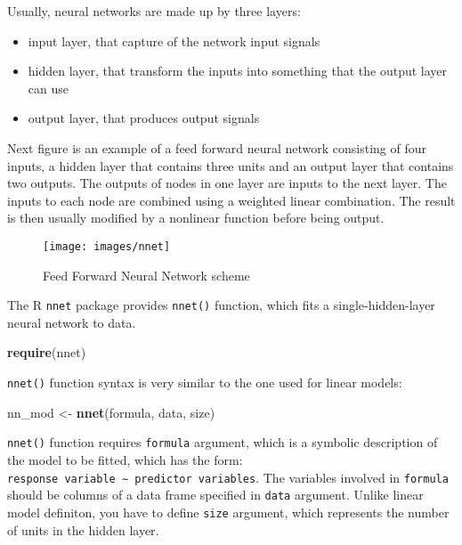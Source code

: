 \documentclass[]{book}
\newenvironment{Shaded}{\begin{snugshade}}{\end{snugshade}}
\newcommand{\KeywordTok}[1]{\textcolor[rgb]{0.13,0.29,0.53}{\textbf{{#1}}}}
\newcommand{\StringTok}[1]{\textcolor[rgb]{0.31,0.60,0.02}{{#1}}}
\newcommand{\NormalTok}[1]{{#1}}
\providecommand{\tightlist}{%
  \setlength{\itemsep}{0pt}\setlength{\parskip}{0pt}}
\def\tightlist{}
\begin{document}
Usually, neural networks are made up by three layers:

\begin{itemize}
\tightlist
\item
  input layer, that capture of the network input signals
\item
  hidden layer, that transform the inputs into something that the output
  layer can use
\item
  output layer, that produces output signals
\end{itemize}

Next figure is an example of a feed forward neural network consisting of
four inputs, a hidden layer that contains three units and an output
layer that contains two outputs. The outputs of nodes in one layer are
inputs to the next layer. The inputs to each node are combined using a
weighted linear combination. The result is then usually modified by a
nonlinear function before being output.

\begin{figure}[h]

{\centering \texttt{[image: images/nnet]} 

}

\caption{Feed Forward Neural Network scheme}\label{fig:g2}
\end{figure}

The R \texttt{nnet} package provides \texttt{nnet()} function, which
fits a single-hidden-layer neural network to data.

\begin{Shaded}
\begin{Highlighting}[]
\KeywordTok{require}\NormalTok{(nnet)}
\end{Highlighting}
\end{Shaded}

\texttt{nnet()} function syntax is very similar to the one used for
linear models:

\begin{Shaded}
\begin{Highlighting}[]
\NormalTok{nn_mod <-}\StringTok{ }\KeywordTok{nnet}\NormalTok{(formula, data, size)}
\end{Highlighting}
\end{Shaded}

\texttt{nnet()} function requires \texttt{formula} argument, which is a
symbolic description of the model to be fitted, which has the form:
\texttt{response\ variable\ ∼\ predictor\ variables}. The variables
involved in \texttt{formula} should be columns of a data frame specified
in \texttt{data} argument. Unlike linear model definiton, you have to
define \texttt{size} argument, which represents the number of units in
the hidden layer.
\end{document}
